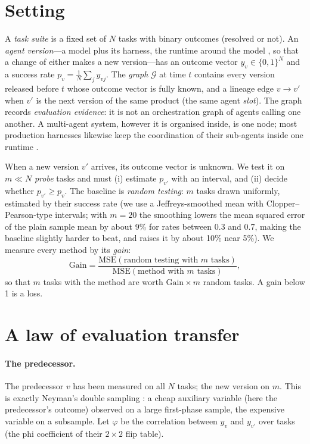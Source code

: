 \documentclass[11pt]{article}
\begin{document}
\section{Setting}
\label{sec:setting}
A \emph{task suite} is a fixed set of $N$ tasks with binary outcomes (resolved or not). An \emph{agent version}---a model plus its harness, the runtime around the model \citep{barbaste2026harness}, so that a change of either
makes a new version---has an outcome vector $y_v\in\{0,1\}^N$ and a success rate $p_v=\frac1N\sum_j y_{vj}$. The \emph{graph}
$\mathcal G$ at time $t$ contains every version released before $t$ whose outcome vector is fully known, and a
lineage edge $v\to v'$ when $v'$ is the next version of the same product (the same agent \emph{slot}). The graph
records \emph{evaluation evidence}: it is not an orchestration graph of agents calling one another. A multi-agent
system, however it is organised inside, is one node; most production harnesses likewise keep the coordination of their
sub-agents inside one runtime \citep{barbaste2026harness}.

When a new version $v'$ arrives, its outcome vector is unknown. We test it on $m\ll N$ \emph{probe} tasks and must
(i) estimate $p_{v'}$ with an interval, and (ii) decide whether $p_{v'}\ge p_v$. The baseline is \emph{random
testing}: $m$ tasks drawn uniformly, estimated by their success rate (we use a Jeffreys-smoothed mean with
Clopper--Pearson-type intervals; with $m=20$ the smoothing lowers the mean squared error of the plain sample mean by
about 9\% for rates between 0.3 and 0.7, making the baseline slightly harder to beat, and raises it by about 10\% near
5\%). We measure every method by its \emph{gain}:
\begin{equation}
\mathrm{Gain} = \frac{\mathrm{MSE}(\text{random testing with } m \text{ tasks})}{\mathrm{MSE}(\text{method with } m \text{ tasks})},
\end{equation}
so that $m$ tasks with the method are worth $\mathrm{Gain}\times m$ random tasks. A gain below 1 is a loss.

\section{A law of evaluation transfer}
\label{sec:law}
\paragraph{The predecessor.} The predecessor $v$ has been measured on all $N$ tasks; the new version on $m$. This is
exactly Neyman's double sampling \citep{neyman1938}: a cheap auxiliary variable (here the predecessor's outcome)
observed on a large first-phase sample, the expensive variable on a subsample. Let $\varphi$ be the correlation
between $y_v$ and $y_{v'}$ over tasks (the phi coefficient of their $2\times2$ flip table).
\end{document}
